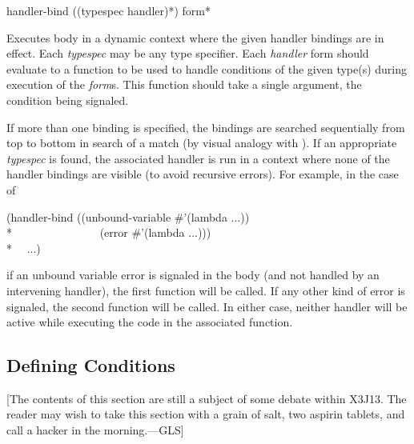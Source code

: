 \begin{defmac}
handler-bind ({(typespec handler)}*) {form}*

Executes body in a dynamic context where the given handler bindings are in
effect.  Each \emph{typespec} may be any type specifier.  Each \emph{handler}
form should evaluate to a function to be used to handle conditions of the given
type(s) during execution of the \emph{form\/}s. This function should take a
single argument, the condition being signaled.

If more than one binding is specified, the bindings are searched sequentially
from top to bottom in search of a match (by visual analogy with
). If an appropriate \emph{typespec} is found, the associated
handler is run in a context where none of the handler bindings are visible (to
avoid recursive errors). For example, in the case of
\begin{lisp}
(handler-bind ((unbound-variable \#'(lambda ...)) \\*
~~~~~~~~~~~~~~~(error \#'(lambda ...))) \\*
~~...)
\end{lisp}
if an unbound variable error is signaled in the body (and not handled by an
intervening handler), the first function will be called. If any other kind of
error is signaled, the second function will be called.  In either case, neither
handler will be active while executing the code in the associated function.
\end{defmac}

\subsection{Defining Conditions}

[The contents of this section are still a subject of some debate within X3J13.
The reader may wish to take this section with a grain of salt, two aspirin
tablets, and call a hacker in the morning.---GLS]

